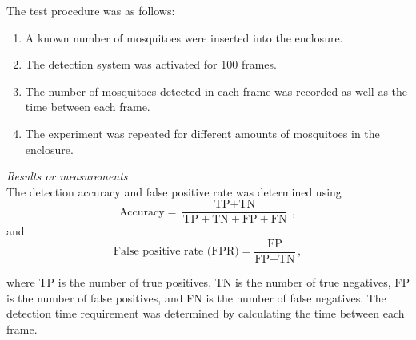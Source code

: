 The test procedure was as follows:
\begin{enumerate}
  \item A known number of mosquitoes were inserted into the enclosure.
  \item The detection system was activated for 100 frames.
  \item The number of mosquitoes detected in each frame was recorded as well as the time between each frame.
  \item The experiment was repeated for different amounts of mosquitoes in the enclosure.
\end{enumerate}

\textit{Results or measurements}\\
The detection accuracy and false positive rate was determined using
\begin{equation}
  \text{Accuracy} = \frac{\text{TP} + \text{TN}}{\text{TP} + \text{TN} + \text{FP} + \text{FN}}\,,
\end{equation}
and
\begin{equation}
  \text{False positive rate (FPR)} = \frac{\text{FP}}{\text{FP} + \text{TN}}\,,
\end{equation}

where TP is the number of true positives, TN is the number of true negatives, FP is the number of false positives, and FN is the number of false negatives. The detection time requirement was determined by calculating the time between each frame.

